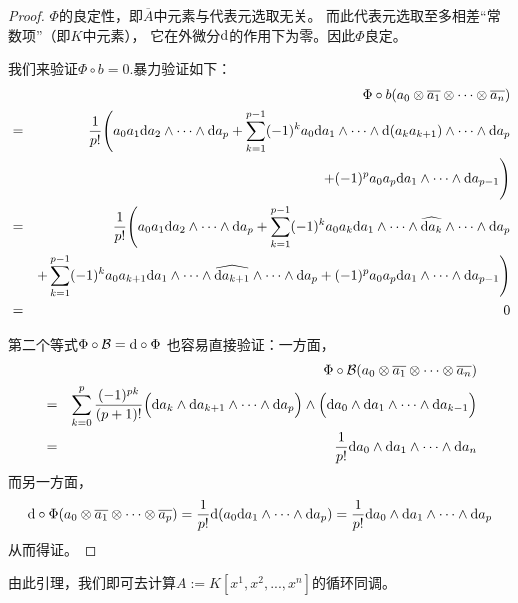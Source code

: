 \begin{proof}
$\Phi$的良定性，即$\overline{A}$中元素与代表元选取无关。
而此代表元选取至多相差“常数项”（即$K$中元素），
它在外微分$\mathrm{d}$的作用下为零。因此$\Phi$良定。

我们来验证$\Phi\circ b=0$.暴力验证如下：
\begin{eqnarray*}
&&   \Phi\circ b
      (a_0\otimes\overline{a_1}\otimes\cdots\otimes\overline{a_n})\\
&=&
    \frac{1}{p!}
    \Bigg(
      a_0a_1\mathrm{d} a_2\wedge\cdots\wedge\mathrm{d} a_p
 +
      \sum_{k=1}^{p-1}(-1)^k
        a_0\mathrm{d} a_1\wedge\cdots\wedge
        \mathrm{d}(a_ka_{k+1})
        \wedge\cdots\wedge\mathrm{d} a_{p}\\
&&+
      (-1)^pa_0a_p
      \mathrm{d} a_1\wedge\cdots\wedge\mathrm{d} a_{p-1}
    \Bigg)\\
&=&
    \frac{1}{p!}
    \Bigg(
      a_0a_1\mathrm{d} a_2\wedge\cdots\wedge\mathrm{d} a_p
 +
      \sum_{k=1}^{p-1}(-1)^k
        a_0a_k\mathrm{d} a_1\wedge\cdots\wedge
        \widehat{\mathrm{d} a_k}
        \wedge\cdots\wedge\mathrm{d} a_{p}\\
&&+
      \sum_{k=1}^{p-1}(-1)^k
        a_0a_{k+1}\mathrm{d} a_1\wedge\cdots\wedge
        \widehat{\mathrm{d} a_{k+1}}
        \wedge\cdots\wedge\mathrm{d} a_{p}
 +
      (-1)^pa_0a_p
      \mathrm{d} a_1\wedge\cdots\wedge\mathrm{d} a_{p-1}
    \Bigg)\\
&=&
    0
\end{eqnarray*}

第二个等式$\Phi\circ\mathcal{B}=\mathrm{d}\circ\Phi$
也容易直接验证：一方面，
\begin{eqnarray*}
&& \Phi\circ\mathcal{B}
     (a_0\otimes\overline{a_1}\otimes\cdots\otimes\overline{a_n})\\
&=&
   \sum_{k=0}^p\frac{(-1)^{pk}}{(p+1)!}
     \Big(
       \mathrm{d} a_k\wedge\mathrm{d} a_{k+1}\wedge\cdots\wedge\mathrm{d} a_p
     \Big)
     \wedge
     \Big(
       \mathrm{d} a_0\wedge\mathrm{d} a_{1}\wedge\cdots\wedge\mathrm{d} a_{k-1}
     \Big)\\
&=&
   \frac{1}{p!}
     \mathrm{d} a_0\wedge\mathrm{d} a_1\wedge\cdots\wedge\mathrm{d} a_{n}
\end{eqnarray*}
而另一方面，
\begin{eqnarray*}
  \mathrm{d}\circ\Phi
      (a_0\otimes\overline{a_1}\otimes\cdots\otimes\overline{a_p})
=
    \frac{1}{p!}
    \mathrm{d}(a_0\mathrm{d} a_{1}\wedge\cdots\wedge\mathrm{d} a_{p})
=
    \frac{1}{p!}
    \mathrm{d} a_0\wedge\mathrm{d} a_{1}\wedge\cdots\wedge\mathrm{d} a_{p}
\end{eqnarray*}
从而得证。
\end{proof}

由此引理，我们即可去计算$A:=K[x^1,x^2,...,x^n]$的循环同调。

